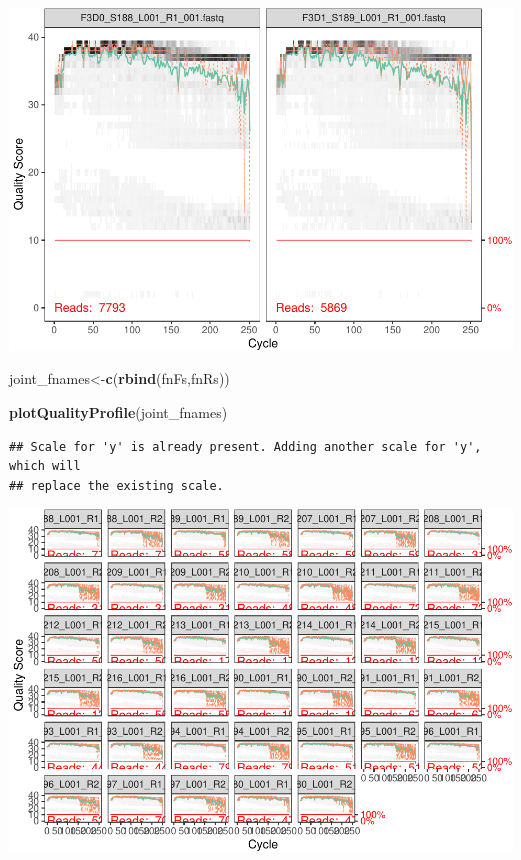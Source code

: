 \documentclass[
]{book}
\newenvironment{Shaded}{\begin{snugshade}}{\end{snugshade}}
\newcommand{\KeywordTok}[1]{\textcolor[rgb]{0.13,0.29,0.53}{\textbf{#1}}}
\newcommand{\NormalTok}[1]{#1}
\begin{document}
\includegraphics{16sworkshop_files/figure-latex/make_plots-1.pdf}

\begin{Shaded}
\begin{Highlighting}[]
\NormalTok{joint_fnames<-}\KeywordTok{c}\NormalTok{(}\KeywordTok{rbind}\NormalTok{(fnFs,fnRs))}

\KeywordTok{plotQualityProfile}\NormalTok{(joint_fnames)}
\end{Highlighting}
\end{Shaded}

\begin{verbatim}
## Scale for 'y' is already present. Adding another scale for 'y', which will
## replace the existing scale.
\end{verbatim}

\includegraphics{16sworkshop_files/figure-latex/make_plots-2.pdf}
\end{document}
